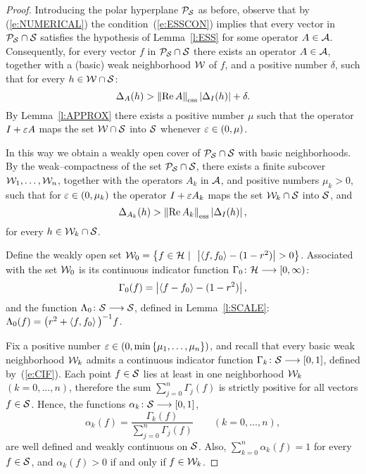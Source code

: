 \begin{proof}
Introducing the polar hyperplane ${\cal P}_{{\cal S}}$ as before, observe
that by (\ref{e:NUMERICAL}) the condition~(\ref{e:ESSCON})
implies that every vector in ${\cal P}_{{\cal S}}\cap{\cal S}$ satisfies the
hypothesis of Lemma~\ref{l:ESS} for some operator $A\in{\cal A}$.
Consequently, for every vector $f$ in ${\cal P}_{{\cal S}}\cap{\cal S}$ there
exists an operator $A\in{\cal A}$, together with a (basic) weak
neighborhood ${\cal W}$ of $f$, and a positive number $\delta$, such
that for every $h\in{\cal W}\cap{\cal S}$:
\[ \Delta_A(h) > \essnorm{\RE{}A}\abs{\Delta_I(h)} + \delta. \]
By Lemma~\ref{l:APPROX} there exists a positive number $\mu$
such that the operator $I+\varepsilon A$ maps the set ${\cal W}\cap{\cal S}$ into
${\cal S}$ whenever $\varepsilon\in(0,\mu)$.

\goodbreak
\def\baselinestretch{1.5}

In this way we obtain a weakly open cover of ${\cal P}_{{\cal S}}\cap{\cal S}$
with basic neighborhoods. By the weak--compactness of the set
${\cal P}_{{\cal S}}\cap{\cal S}$, there exists a finite subcover
${\cal W}_1,\ldots,{\cal W}_n$, together with the operators $A_k$ in ${\cal A}$,
and positive numbers $\mu_k>0$, such that for
$\varepsilon\in(0,\mu_k)$ the operator $I+\varepsilon{}A_k$ maps the set
${\cal W}_k\cap{\cal S}$ into ${\cal S}$, and
\begin{equation}\label{e:EINEQ}
  \Delta_{A_k}(h) > \essnorm{\RE{}A_k} \abs{\Delta_I(h)},
\end{equation}
for every $h\in{\cal W}_k\cap{\cal S}$.

Define the weakly open set $
{\cal W}_0=\left\{f\in{\cal H}\,\,|\,\,\,\left\vert\left<f,f_0\right>-(1-r^2)\right\vert>0\right\}$.
Associated with the set ${\cal W}_0$ is its continuous indicator
function $\Gamma_0\colon{\cal H}\longrightarrow[0,\infty)$:
\[ \Gamma_0(f)=\left\vert\left<f-f_0\right>-(1-r^2)\right\vert, \]
and the function $\Lambda_0\colon{\cal S}\longrightarrow{\cal S}$, defined in
Lemma~\ref{l:SCALE}: $\Lambda_0(f) =
\big(r^2+\left<f,f_0\right>\big)^{-1}f$.

\smallskip

Fix a positive number
$\varepsilon\in(0,\min\left\{\mu_1,\ldots,\mu_n\right\})$, and recall that
every basic weak neighborhood ${\cal W}_k$ admits a continuous
indicator function $\Gamma_k\colon{\cal S}\longrightarrow[0,1]$, defined
by~(\ref{e:CIF}). Each point $f\in{\cal S}$ lies at least in one
neighborhood ${\cal W}_k$ $(k=0,\ldots,n)$, therefore the sum
$\sum_{j=0}^n\Gamma_j(f)$ is strictly positive for all vectors
$f\in{\cal S}$. Hence, the functions $\alpha_k\colon{\cal S}\longrightarrow[0,1]$,
\[ \alpha_k(f) =
   \frac{\Gamma_k(f)}{\sum_{j=0}^n \Gamma_j(f)}
   \quad\quad   (k=0,\ldots,n), \]
are well defined and weakly continuous on ${\cal S}$. Also,
$\sum_{k=0}^n\alpha_k(f)=1$ for every $f \in {\cal S}$, and
$\alpha_k(f)>0$ if and only if $f\in{\cal W}_k$.


\end{proof}
